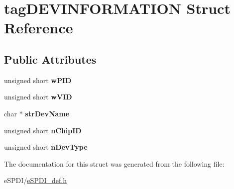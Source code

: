 \hypertarget{structtag_d_e_v_i_n_f_o_r_m_a_t_i_o_n}{}\section{tag\+D\+E\+V\+I\+N\+F\+O\+R\+M\+A\+T\+I\+ON Struct Reference}
\label{structtag_d_e_v_i_n_f_o_r_m_a_t_i_o_n}
\subsection*{Public Attributes}
\begin{DoxyCompactItemize}
\item 
\mbox{\label{structtag_d_e_v_i_n_f_o_r_m_a_t_i_o_n_a883642740ea7a1140d684120c18cbc20}} 
unsigned short {\bfseries w\+P\+ID}
\item 
\mbox{\label{structtag_d_e_v_i_n_f_o_r_m_a_t_i_o_n_a272241290dc7c008ab2dee50fa10eb2d}} 
unsigned short {\bfseries w\+V\+ID}
\item 
\mbox{\label{structtag_d_e_v_i_n_f_o_r_m_a_t_i_o_n_a02cf1bd3e2d8822f53712fb53fd818fb}} 
char $\ast$ {\bfseries str\+Dev\+Name}
\item 
\mbox{\label{structtag_d_e_v_i_n_f_o_r_m_a_t_i_o_n_aae8df5a1ec781b28d59fb6705bde0869}} 
unsigned short {\bfseries n\+Chip\+ID}
\item 
\mbox{\label{structtag_d_e_v_i_n_f_o_r_m_a_t_i_o_n_a8ee9153e8066f0b6cfb136d256d5f803}} 
unsigned short {\bfseries n\+Dev\+Type}
\end{DoxyCompactItemize}


The documentation for this struct was generated from the following file\+:\begin{DoxyCompactItemize}
\item 
e\+S\+P\+D\+I/\hyperlink{e_s_p_d_i__def_8h}{e\+S\+P\+D\+I\+\_\+def.\+h}\end{DoxyCompactItemize}
